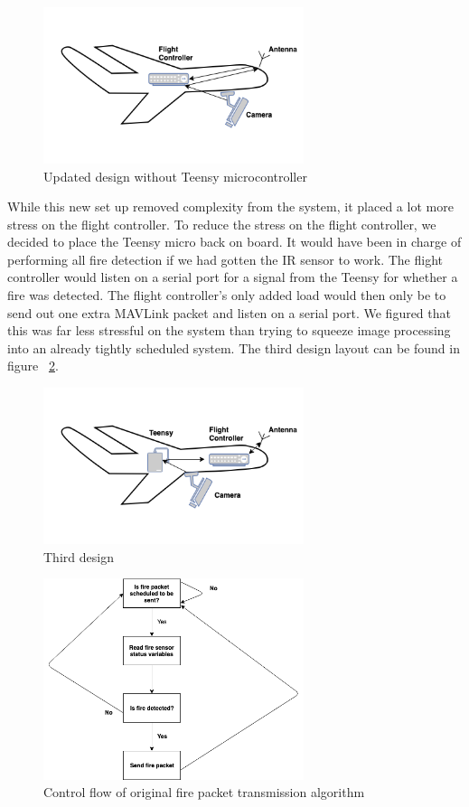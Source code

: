 \documentclass[12pt,journal,compsoc]{IEEEtran}
\begin{document}
\begin{figure}[h!]
\hspace*{0cm}
\centering
\includegraphics[width=3in]{Version2.png}
\caption{Updated design without Teensy microcontroller}
\label{version2}
\end{figure}

While this new set up removed complexity from the system, it placed a lot more stress on the flight controller. To reduce the stress on the flight controller, we decided to place the Teensy micro back on board. It would have been in charge of performing all fire detection if we had gotten the IR sensor to work. The flight controller would listen on a serial port for a signal from the Teensy for whether a fire was detected. The flight controller's only added load would then only be to send out one extra MAVLink packet and listen on a serial port. We figured that this was far less stressful on the system than trying to squeeze image processing into an already tightly scheduled system. The third design layout can be found in figure ~\ref{version3}.

\begin{figure}[h!]
\hspace*{0cm}
\centering
\includegraphics[width=3in]{Version3.png}
\caption{Third design}
\label{version3}
\end{figure}

\begin{figure}[h!]
\hspace*{0cm}
\centering
\includegraphics[width=3in]{Sending.png}
\caption{Control flow of original fire packet transmission algorithm}
\label{sending}
\end{figure}
\end{document}
